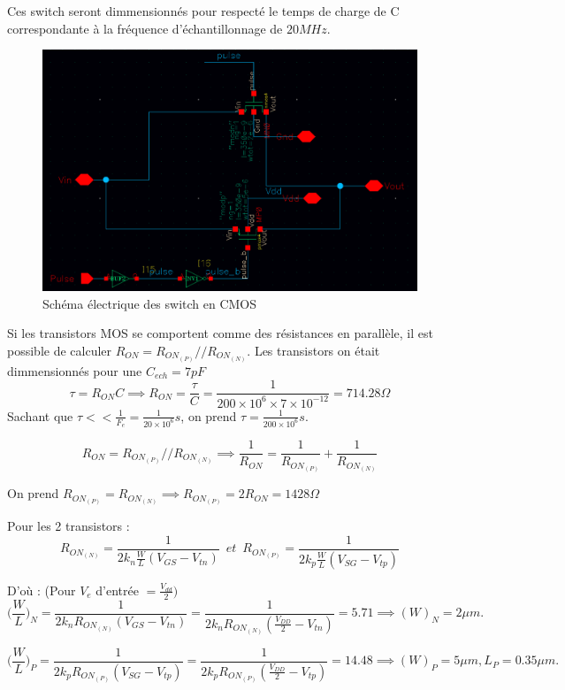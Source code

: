 \documentclass[11pt]{article}
\begin{document}
Ces switch seront dimmensionn\'es pour respect\'e le temps de charge de C
correspondante \`a la fr\'equence d'\'echantillonnage de $20 MHz$.

\begin{figure}[!htb]
\begin{center}
  \includegraphics[width=0.8\linewidth]{switchs_.png}
  \caption{Sch\'ema \'electrique des switch en CMOS}
\end{center}
\end{figure}

\clearpage

Si les transistors MOS se comportent comme des r\'esistances en parall\`ele,
il est possible de calculer $R_{ON} = R_{ON_{(P)}}//R_{ON_{(N)}}$.
Les transistors on \'etait dimmensionn\'es pour une $C_{ech} = 7 pF$
\[
  \tau = R_{ON} C \implies R_{ON} = \frac{\tau}{C} = \frac{1}{200\times10^{6}\times7\times10^{-12}} = 714.28 \Omega
\]
Sachant que $\tau << \frac{1}{F_e} = \frac{1}{20\times10^6} s$, on prend $\tau = \frac{1}{200 \times 10^6} s$.

\[
  R_{ON} = R_{ON_{(P)}}//R_{ON_{(N)}} \implies \frac{1}{R_{ON}} = \frac{1}{ R_{ON_{(P)}}} + \frac{1}{ R_{ON_{(N)}}}
\]

On prend $  R_{ON_{(P)}} =  R_{ON_{(N)}} \implies  R_{ON_{(P)}} = 2 R_{ON} = 1428 \Omega$

Pour les 2 transistors :
\[
R_{ON_{(N)}} = \frac{1}{2k_n \frac{W}{L} (V_{GS} - V_{tn})} \phantom{2} et \phantom{2} R_{ON_{(P)}} = \frac{1}{2k_p \frac{W}{L} (V_{SG} - V_{tp})}
\]

D'o\`u : (Pour $V_{e}$ d'entr\'ee $ = \frac{V_{dd}}{2})$
\[
\bigg(\frac{W}{L}\bigg)_{N} = \frac{1}{2k_n R_{ON_{(N)}}  (V_{GS} - V_{tn})} =\frac{1}{2k_n R_{ON_{(N)}}  (\frac{V_{DD}}{2} - V_{tn})} = 5.71 \implies (W)_{N} = 2 \mu m.
\]

\[
\bigg(\frac{W}{L}\bigg)_{P} = \frac{1}{2k_p R_{ON_{(P)}}  (V_{SG} - V_{tp})} = \frac{1}{2k_p R_{ON_{(P)}}  (\frac{V_{DD}}{2} - V_{tp})} = 14.48 \implies (W)_{P} = 5 \mu m,  L_{P} = 0.35 \mu m.
\]
\end{document}
